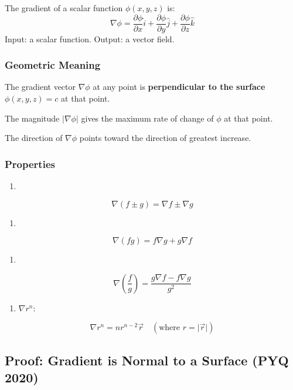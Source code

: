 \documentclass[
]{article}
\providecommand{\tightlist}{%
  \setlength{\itemsep}{0pt}\setlength{\parskip}{0pt}}
\begin{document}
The gradient of a scalar function \(\phi(x, y, z)\) is:
\[
\nabla\phi = \frac{\partial\phi}{\partial x}\hat{i} + \frac{\partial\phi}{\partial y}\hat{j} + \frac{\partial\phi}{\partial z}\hat{k}
\]
Input: a scalar function. Output: a vector field.

\subsubsection{Geometric Meaning}\label{geometric-meaning}

The gradient vector \(\nabla\phi\) at any point is \textbf{perpendicular
to the surface} \(\phi(x, y, z) = c\) at that point.

The magnitude \(\lvert \nabla\phi \rvert\) gives the maximum rate of
change of \(\phi\) at that point.

The direction of \(\nabla\phi\) points toward the direction of greatest
increase.

\subsubsection{Properties}\label{properties}

\begin{enumerate}
\def\labelenumi{\arabic{enumi}.}
\tightlist
\item
\end{enumerate}
\[
\nabla(f \pm g) = \nabla f \pm \nabla g
\]
\begin{enumerate}
\def\labelenumi{\arabic{enumi}.}
\setcounter{enumi}{1}
\tightlist
\item
\end{enumerate}
\[
\nabla(fg) = f\nabla g + g\nabla f
\]
\begin{enumerate}
\def\labelenumi{\arabic{enumi}.}
\setcounter{enumi}{2}
\tightlist
\item
\end{enumerate}
\[
\nabla\left(\frac{f}{g}\right) = \frac{g\nabla f - f\nabla g}{g^2}
\]
\begin{enumerate}
\def\labelenumi{\arabic{enumi}.}
\setcounter{enumi}{3}
\tightlist
\item
  \(\nabla r^n\):
\end{enumerate}
\[
\nabla r^n = nr^{n-2}\vec{r} \quad (\text{where } r = \lvert \vec{r} \rvert)
\]

\subsection{Proof: Gradient is Normal to a Surface (PYQ
2020)}\label{proof-gradient-is-normal-to-a-surface-pyq-2020}
\end{document}
